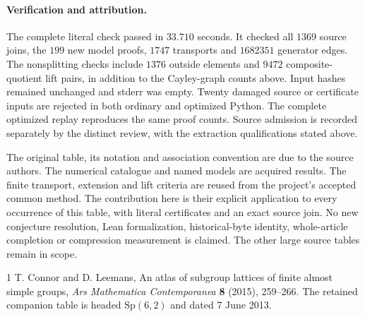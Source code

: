 \documentclass[11pt]{article}
\begin{document}
\paragraph{Verification and attribution.}
The complete literal check passed in $33.710$ seconds. It checked all
$1369$ source joins, the $199$ new model proofs, $1747$ transports and
$1682351$ generator edges. The nonsplitting checks include $1376$ outside
elements and $9472$ composite-quotient lift pairs, in addition to the
Cayley-graph counts above. Input hashes remained unchanged and stderr was
empty. Twenty damaged source or certificate inputs are rejected in both
ordinary and optimized Python. The complete optimized replay reproduces
the same proof counts. Source admission is recorded separately by the
distinct review, with the extraction qualifications stated above.

The original table, its notation and association convention are due to
the source authors. The numerical catalogue and named models are acquired
results. The finite transport, extension and lift criteria are reused
from the project's accepted common method. The contribution here is their
explicit application to every occurrence of this table, with literal
certificates and an exact source join. No new conjecture resolution,
Lean formalization, historical-byte identity, whole-article completion or
compression measurement is claimed. The other large source tables remain
in scope.

\begin{thebibliography}{1}
 T. Connor and D. Leemans,
An atlas of subgroup lattices of finite almost simple groups,
\emph{Ars Mathematica Contemporanea} \textbf{8} (2015), 259--266.
The retained companion table is headed $\mathrm{Sp}(6,2)$ and dated
7 June 2013.
\end{thebibliography}
\end{document}
